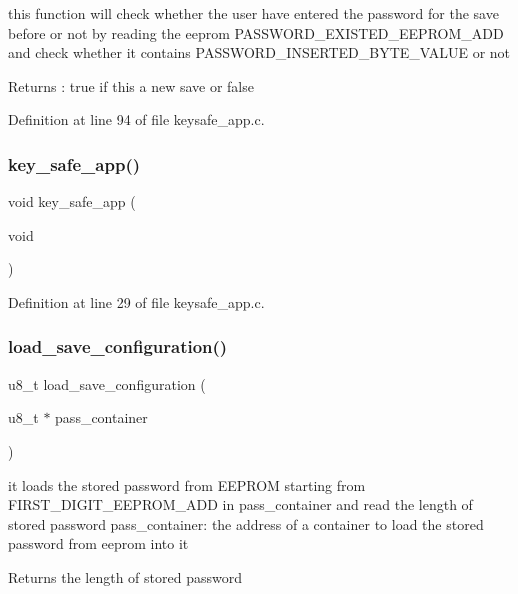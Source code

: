 this function will check whether the user have entered the password for the save before or not by reading the eeprom P\+A\+S\+S\+W\+O\+R\+D\+\_\+\+E\+X\+I\+S\+T\+E\+D\+\_\+\+E\+E\+P\+R\+O\+M\+\_\+\+A\+DD and check whether it contains P\+A\+S\+S\+W\+O\+R\+D\+\_\+\+I\+N\+S\+E\+R\+T\+E\+D\+\_\+\+B\+Y\+T\+E\+\_\+\+V\+A\+L\+UE or not 

\begin{DoxyReturn}{Returns}
\+: true if this a new save or false 
\end{DoxyReturn}


Definition at line 94 of file keysafe\+\_\+app.\+c.

\mbox{\label{keysafe__app_8c_aca90bf7d2d770078da3a661b85ce5198}} 
\subsubsection{key\+\_\+safe\+\_\+app()}
{\footnotesize\ttfamily void key\+\_\+safe\+\_\+app (\begin{DoxyParamCaption}\item[{void}]{ }\end{DoxyParamCaption})}



Definition at line 29 of file keysafe\+\_\+app.\+c.

\mbox{\label{keysafe__app_8c_a4bd8c5bde81b9ab9b0d1876b83222c03}} 
\subsubsection{load\+\_\+save\+\_\+configuration()}
{\footnotesize\ttfamily u8\+\_\+t load\+\_\+save\+\_\+configuration (\begin{DoxyParamCaption}\item[{u8\+\_\+t $\ast$}]{pass\+\_\+container }\end{DoxyParamCaption})}

it loads the stored password from E\+E\+P\+R\+OM starting from F\+I\+R\+S\+T\+\_\+\+D\+I\+G\+I\+T\+\_\+\+E\+E\+P\+R\+O\+M\+\_\+\+A\+DD in pass\+\_\+container and read the length of stored password  pass\+\_\+container\+: the address of a container to load the stored password from eeprom into it \begin{DoxyReturn}{Returns}
the length of stored password 
\end{DoxyReturn}


